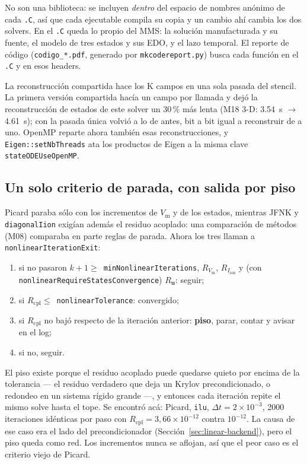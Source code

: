 \documentclass[11pt,a4paper]{article}
\newcommand{\code}[1]{\texttt{\small #1}}
\newcommand{\Vm}{V_{\text{m}}}
\newcommand{\Iion}{I_{\mathrm{ion}}}
\begin{document}
No son una biblioteca: se incluyen \emph{dentro} del espacio de nombres anónimo de cada
\code{.C}, así que cada ejecutable compila su copia y un cambio ahí cambia los dos solvers.
En el \code{.C} queda lo propio del MMS: la solución manufacturada y su fuente, el modelo de
tres estados y sus EDO, y el lazo temporal. El reporte de código (\code{codigo\_*.pdf},
generado por \code{mkcodereport.py}) busca cada función en el \code{.C} y en esos headers.

La reconstrucción compartida hace los K campos en una sola pasada del stencil. La primera
versión compartida hacía un campo por llamada y dejó la reconstrucción de estados de este
solver un 30\,\% más lenta (M18 3-D: 3.54~s $\to$ 4.61~s); con la pasada única volvió a lo de
antes, bit a bit igual a reconstruir de a uno. OpenMP reparte ahora también esas
reconstrucciones, y \code{Eigen::setNbThreads} ata los productos de Eigen a la misma clave
\code{stateODEUseOpenMP}.

\subsection{Un solo criterio de parada, con salida por piso}
\label{sec:oct-stop}

Picard paraba sólo con los incrementos de $\Vm$ y de los estados, mientras JFNK y
\code{diagonalIion} exigían además el residuo acoplado: una comparación de métodos (M08)
comparaba en parte reglas de parada. Ahora los tres llaman a \code{nonlinearIterationExit}:
\begin{enumerate}[nosep]
  \item si no pasaron $k+1\ge$~\code{minNonlinearIterations}, $R_{\Vm}$, $R_{\Iion}$ y (con
        \code{nonlinearRequireStatesConvergence}) $R_{\mathbf{u}}$: seguir;
  \item si $R_{\mathrm{cpl}}\le$~\code{nonlinearTolerance}: convergido;
  \item si $R_{\mathrm{cpl}}$ no bajó respecto de la iteración anterior: \textbf{piso}, parar,
        contar y avisar en el log;
  \item si no, seguir.
\end{enumerate}
El piso existe porque el residuo acoplado puede quedarse quieto por encima de la tolerancia
--- el residuo verdadero que deja un Krylov precondicionado, o redondeo en un sistema rígido
grande ---, y entonces cada iteración repite el mismo solve hasta el tope. Se encontró acá:
Picard, \code{ilu}, $\Delta t=2\times10^{-3}$, 2000 iteraciones idénticas por paso con
$R_{\mathrm{cpl}}=3{,}66\times10^{-12}$ contra $10^{-12}$. La causa de ese caso era el lado
del precondicionador (Sección~\ref{sec:linear-backend}), pero el piso queda como red. Los
incrementos nunca se aflojan, así que el peor caso es el criterio viejo de Picard.
\end{document}
